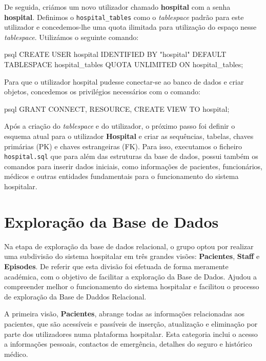De seguida, criámos um novo utilizador chamado \textbf{hospital} com a senha \textbf{hospital}. Definimos o \texttt{hospital\_tables} como o \textit{tablespace} padrão para este utilizador e concedemos-lhe uma quota ilimitada para utilização do espaço nesse \textit{tablespace}. Utilizámos o seguinte comando:

\begin{myminted}{psql}
CREATE USER hospital IDENTIFIED BY "hospital" DEFAULT TABLESPACE hospital_tables 
QUOTA UNLIMITED ON hospital_tables;
\end{myminted}

Para que o utilizador hospital pudesse conectar-se ao banco de dados e criar objetos, concedemos os privilégios necessários com o comando:

\begin{myminted}{psql}
GRANT CONNECT, RESOURCE, CREATE VIEW TO hospital;
\end{myminted}

Após a criação do \textit{tablespace} e do utilizador, o próximo passo foi definir o esquema atual para o utilizador \textbf{Hospital} e criar as sequências, tabelas, chaves primárias (PK) e chaves estrangeiras (FK). Para isso, executamos o ficheiro \texttt{hospital.sql} que para além das estruturas da base de dados, possui também os comandos para inserir dados iniciais, como informações de pacientes, funcionários, médicos e outras entidades fundamentais para o funcionamento do sistema hospitalar.

\section{Exploração da Base de Dados}

Na etapa de exploração da base de dados relacional, o grupo optou por realizar uma subdivisão do sistema hospitalar em três grandes visões: \textbf{Pacientes}, \textbf{Staff} e \textbf{Episodes}. De referir que esta divisão foi efetuada de forma meramente académica, com o objetivo de facilitar a exploração da Base de Dados. Ajudou a compreender melhor o funcionamento do sistema hospitalar e facilitou o processo de exploração da Base de Daddos Relacional.

A primeira visão, \textbf{Pacientes}, abrange todas as informações relacionadas aos pacientes, que são acessíveis e passíveis de inserção, atualização e eliminação por parte dos utilizadores numa plataforma hospitalar. Esta categoria inclui o acesso a informações pessoais, contactos de emergência, detalhes do seguro e histórico médico.

